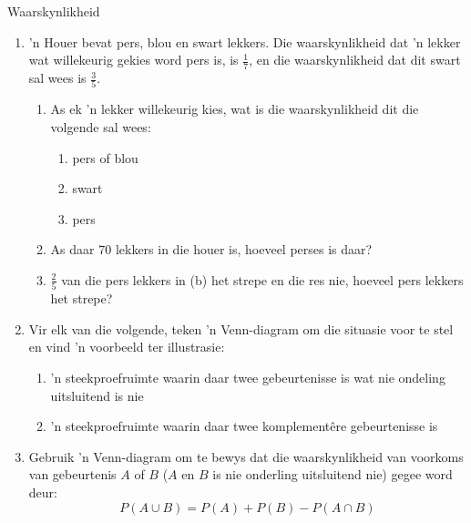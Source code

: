 \begin{eocexercises}{Waarskynlikheid}
\begin{enumerate}[itemsep=5pt, label=\textbf{\arabic*}.]
\begin{enumerate}[noitemsep, label=\textbf{(\alph*)} ]
    \item Wat is die waarskynlikheid dat 'n kind wat willekeurig gekies word die volgende het:
       \begin{enumerate}[noitemsep, label=\textbf{\roman*.} ]
      \item bruin o\"e
      \item rooi hare
      \end{enumerate} 
    \item 'n Kind met bruin o\"e word willekeurig gekies. Wat is die waarskynlikheid dat hierdie kind rooi hare het?
    \end{enumerate}
  \item 'n Houer bevat pers, blou en swart lekkers. Die waarskynlikheid dat 'n lekker wat willekeurig gekies word pers is, is $\frac{1}{7}$, en die waarskynlikheid dat dit swart sal wees is $\frac{3}{5}$.
    \begin{enumerate}[noitemsep, label=\textbf{(\alph*)} ]
    \item As ek 'n lekker willekeurig kies, wat is die waarskynlikheid dit die volgende sal wees:
       \begin{enumerate}[noitemsep, label=\textbf{\roman*.} ]
      \item pers of blou
      \item swart
      \item pers
      \end{enumerate}
    \item As daar $70$ lekkers in die houer is, hoeveel perses is daar?
    \item $\frac{2}{5}$ van die pers lekkers in (b) het strepe en die res nie, hoeveel pers lekkers het strepe?
    \end{enumerate}
  \item Vir elk van die volgende, teken 'n Venn-diagram om die situasie voor te stel en vind 'n voorbeeld ter illustrasie:
    \begin{enumerate}[noitemsep, label=\textbf{(\alph*)} ]
    \item 'n steekproefruimte waarin daar twee gebeurtenisse is wat nie ondeling uitsluitend is nie
    \item 'n steekproefruimte waarin daar twee komplement\^ere gebeurtenisse is
    \end{enumerate}
  \item Gebruik 'n Venn-diagram om te bewys dat die waarskynlikheid van voorkoms van gebeurtenis  $A$ of $B$ ($A$ en $B$ is nie onderling uitsluitend nie) gegee word deur:
    \[P(A \cup B) = P(A) + P(B) - P(A \cap B)\]

\end{enumerate}
\end{eocexercises}
